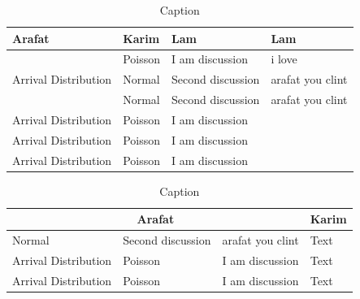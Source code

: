 \documentclass[12pt,a4paper]{article}
\begin{document}
\begin{table}[H]
    \centering
    \begin{tabular}{|p{4cm}|p{3cm}|p{4cm}|p{4cm}|}
    \hline
    {\bf Arafat}&{\bf Karim}&{\bf Lam}& {\bf Lam}\\
    \hline
     \multirow{3}{*}{Arrival Distribution} & Poisson & I am discussion& i love  \\
    \cline{2-4} & Normal & Second discussion & arafat you clint \\
    \cline{2-4} & Normal & Second discussion & arafat you clint \\
    \hline

    Arrival Distribution & Poisson & I am discussion\\
    \hline
  
    Arrival Distribution & Poisson & I am discussion\\
    \hline
    
    Arrival Distribution & Poisson & I am discussion\\
    \hline
    
    \end{tabular}
    \caption{Caption}
    \label{tab:placeholder}
\end{table}
\vspace{0.1cm}

\begin{table}[H]
\centering
\begin{tabular}{|p{4cm}|p{3cm}|p{4cm}|p{4cm}|}
\hline

\multicolumn{3}{|c|}{\bf Arafat} & {\bf Karim} \\
\hline

Normal & Second discussion & arafat you clint & Text \\
\hline

Arrival Distribution & Poisson & I am discussion & Text \\
\hline

Arrival Distribution & Poisson & I am discussion & Text \\
\hline

\end{tabular}
\caption{Caption}
\label{tab:placeholder}
\end{table}
\end{document}
